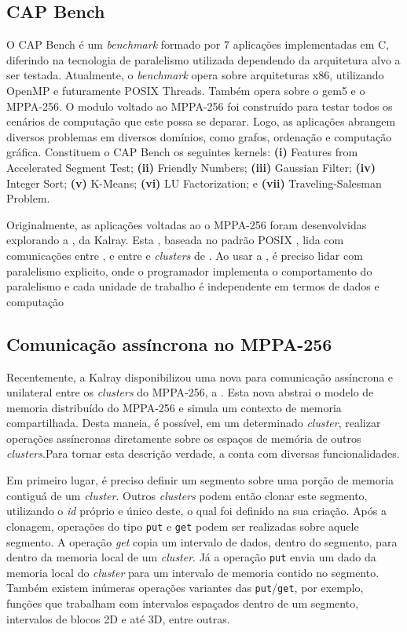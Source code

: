 \documentclass[a4paper,11pt]{article}
\newcommand{\mppa}{MPPA-256\xspace}
\newcommand{\capb}{CAP Bench\xspace}
\begin{document}
\subsection{\capb}
\label{subsec:capb}

O \capb é um \textit{benchmark} formado por 7 aplicações implementadas em C, diferindo na tecnologia de paralelismo utilizada dependendo da arquitetura alvo a ser testada. Atualmente, o \textit{benchmark} opera sobre arquiteturas x86, utilizando OpenMP e futuramente POSIX Threads. Também opera sobre o gem5 e o \mppa. O modulo voltado ao \mppa foi construído para testar todos os cenários de computação que este possa se deparar. Logo, as aplicações abrangem diversos problemas em diversos domínios, como grafos, ordenação e computação gráfica. Constituem o \capb os seguintes kernels: \textbf{(i)} Features from Accelerated Segment Test; \textbf{(ii)} Friendly Numbers; \textbf{(iii)} Gaussian Filter; \textbf{(iv)} Integer Sort; \textbf{(v)} K-Means; \textbf{(vi)} LU Factorization; e \textbf{(vii)} Traveling-Salesman Problem.

Originalmente, as aplicações voltadas ao o \mppa foram desenvolvidas explorando a \api \ipc, da Kalray. Esta \api, baseada no padrão POSIX \ipc, lida com comunicações entre \ccs, e entre \ccs e \textit{clusters} de \es. Ao usar a \ipc, é preciso lidar com paralelismo explicito, onde o programador implementa o comportamento do paralelismo e cada unidade de trabalho é independente em termos de dados e computação \cite{Castro-Souza-CCPE:2016}


\subsection{Comunicação assíncrona no \mppa}
\label{subsec:async}

Recentemente, a Kalray disponibilizou uma nova \api para comunicação assíncrona e unilateral entre os \textit{clusters} do \mppa, a \async. Esta nova \api abstrai o modelo de memoria distribuído do \mppa e simula um contexto de memoria compartilhada. Desta maneia, é possível, em um determinado \textit{cluster}, realizar operações assíncronas diretamente sobre os espaços de memória de outros \textit{clusters}.Para tornar esta descrição verdade, a \api conta com diversas funcionalidades.

Em primeiro lugar, é preciso definir um segmento sobre uma porção de memoria contiguá de um \textit{cluster}. Outros \textit{clusters} podem então clonar este segmento, utilizando o \textit{id} próprio e único deste, o qual foi definido na sua criação. Após a clonagem, operações do tipo \texttt{put} e \texttt{get} podem ser realizadas sobre aquele segmento. A operação \textit{get} copia um intervalo de dados, dentro do segmento, para dentro da memoria local de um \textit{cluster}. Já a operação \texttt{put} envia um dado da memoria local do \textit{cluster} para um intervalo de memoria contido no segmento. Também existem inúmeras operações variantes das \texttt{put}/\texttt{get}, por exemplo, funções que trabalham com intervalos espaçados dentro de um segmento, intervalos de blocos 2D e até 3D, entre outras.
\end{document}
